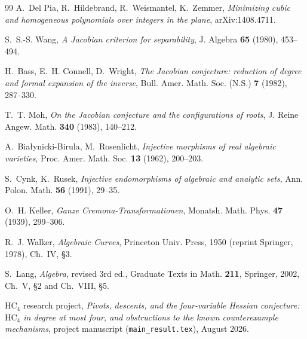 \documentclass[11pt]{article}
\theoremstyle{plain}
\theoremstyle{definition}
\newcommand{\HC}{\mathrm{HC}}
\begin{document}
\begin{thebibliography}{99}
 A.~Del Pia, R.~Hildebrand, R.~Weismantel, K.~Zemmer,
\emph{Minimizing cubic and homogeneous polynomials over integers in the
plane}, arXiv:1408.4711.

 S.~S.-S. Wang, \emph{A Jacobian criterion for
separability}, J. Algebra \textbf{65} (1980), 453--494.

 H.~Bass, E.~H. Connell, D.~Wright, \emph{The Jacobian
conjecture: reduction of degree and formal expansion of the inverse},
Bull. Amer. Math. Soc. (N.S.) \textbf{7} (1982), 287--330.

 T.~T. Moh, \emph{On the Jacobian conjecture and the
configurations of roots}, J. Reine Angew. Math. \textbf{340} (1983),
140--212.

 A.~Bia{\l}ynicki-Birula, M.~Rosenlicht, \emph{Injective
morphisms of real algebraic varieties}, Proc. Amer. Math. Soc.
\textbf{13} (1962), 200--203.

 S.~Cynk, K.~Rusek, \emph{Injective endomorphisms of
algebraic and analytic sets}, Ann. Polon. Math. \textbf{56} (1991),
29--35.

 O.~H. Keller, \emph{Ganze Cremona-Transformationen},
Monatsh. Math. Phys. \textbf{47} (1939), 299--306.

 R.~J. Walker, \emph{Algebraic Curves}, Princeton Univ.
Press, 1950 (reprint Springer, 1978), Ch.~IV, \S3.

 S.~Lang, \emph{Algebra}, revised 3rd ed., Graduate Texts
in Math. \textbf{211}, Springer, 2002, Ch.~V, \S2 and Ch.~VIII, \S5.

 HC$_4$ research project, \emph{Pivots, descents,
and the four-variable Hessian conjecture: $\HC_4$ in degree at most
four, and obstructions to the known counterexample mechanisms}, project
manuscript (\texttt{main\_result.tex}), August 2026.

\end{thebibliography}
\end{document}
